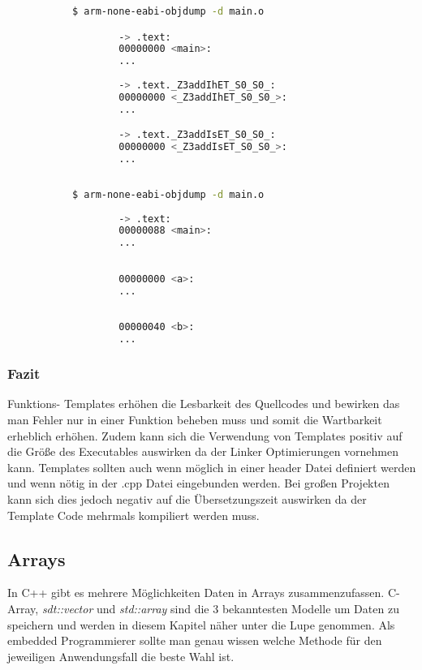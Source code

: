\documentclass[MES,Master,ngerman]{twbook}%
\begin{document}
\begin{figure}[!htb]
	\begin{subfigure}[b]{0.5\textwidth}
		\begin{lstlisting}[gobble=6, title={Analyse C++}, language=bash, numbers=none]
		$ arm-none-eabi-objdump -d main.o

		-> .text:
		00000000 <main>:
		...
		
		-> .text._Z3addIhET_S0_S0_:
		00000000 <_Z3addIhET_S0_S0_>:
		...

		-> .text._Z3addIsET_S0_S0_:
		00000000 <_Z3addIsET_S0_S0_>:
		...
		
		\end{lstlisting}
	\end{subfigure}
	\begin{subfigure}[b]{0.5\textwidth}
		\begin{lstlisting}[gobble=6, title={Analyse C}, language=bash, numbers=none]
		$ arm-none-eabi-objdump -d main.o
		
		-> .text:
		00000088 <main>:
		...
		
		
		00000000 <a>:
		...
		
		
		00000040 <b>:
		...
		\end{lstlisting}
	\end{subfigure}
\end{figure}

\subsubsection{Fazit}
Funktions- Templates erhöhen die Lesbarkeit des Quellcodes und bewirken das man Fehler nur in einer Funktion beheben muss und somit die Wartbarkeit erheblich erhöhen. Zudem kann sich die Verwendung von Templates positiv auf die Größe des Executables auswirken da der Linker Optimierungen vornehmen kann. Templates sollten auch wenn möglich in einer header Datei definiert werden und wenn nötig in der .cpp Datei eingebunden werden. Bei großen Projekten kann sich dies jedoch negativ auf die Übersetzungszeit auswirken da der Template Code mehrmals kompiliert werden muss.
\newpage

\subsection{Arrays}
In C++ gibt es mehrere Möglichkeiten Daten in Arrays zusammenzufassen. C- Array, \textit{sdt::vector} und \textit{std::array} sind die 3 bekanntesten Modelle um Daten zu speichern und werden in diesem Kapitel näher unter die Lupe genommen. Als embedded Programmierer sollte man genau wissen welche Methode für den jeweiligen Anwendungsfall die beste Wahl ist.
\end{document}
